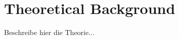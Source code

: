 \tikzset{external/prefix=tikz/Theory/}
\chapter{Theoretical Background}
Beschreibe hier die Theorie...